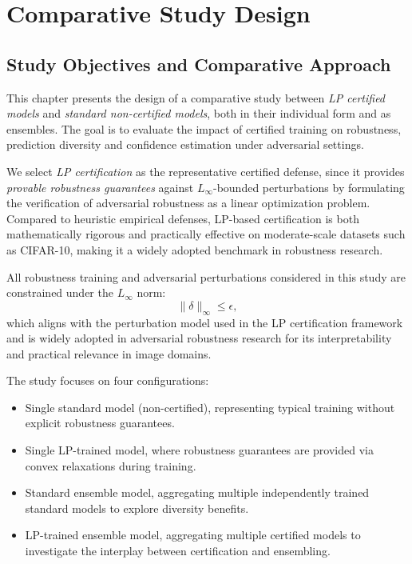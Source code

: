 \chapter{Comparative Study Design}

\section{Study Objectives and Comparative Approach}
\indent

This chapter presents the design of a comparative study between \textit{LP certified models} and \textit{standard non-certified models}, both in their individual form and as ensembles. The goal is to evaluate the impact of certified training on robustness, prediction diversity and confidence estimation under adversarial settings.

We select \textit{LP certification} as the representative certified defense, since it provides \emph{provable robustness guarantees} against $L_\infty$-bounded perturbations by formulating the verification of adversarial robustness as a linear optimization problem. Compared to heuristic empirical defenses, LP-based certification is both mathematically rigorous and practically effective on moderate-scale datasets such as CIFAR-10, making it a widely adopted benchmark in robustness research.

All robustness training and adversarial perturbations considered in this study are constrained under the $L_\infty$ norm:
\[
\|\delta\|_\infty \leq \epsilon,
\]
which aligns with the perturbation model used in the LP certification framework and is widely adopted in adversarial robustness research for its interpretability and practical relevance in image domains.




The study focuses on four configurations:
\begin{itemize}
    \item Single standard model (non-certified), representing typical training without explicit robustness guarantees.
    \item Single LP-trained model, where robustness guarantees are provided via convex relaxations during training.
    \item Standard ensemble model, aggregating multiple independently trained standard models to explore diversity benefits.
    \item LP-trained ensemble model, aggregating multiple certified models to investigate the interplay between certification and ensembling.
\end{itemize}

